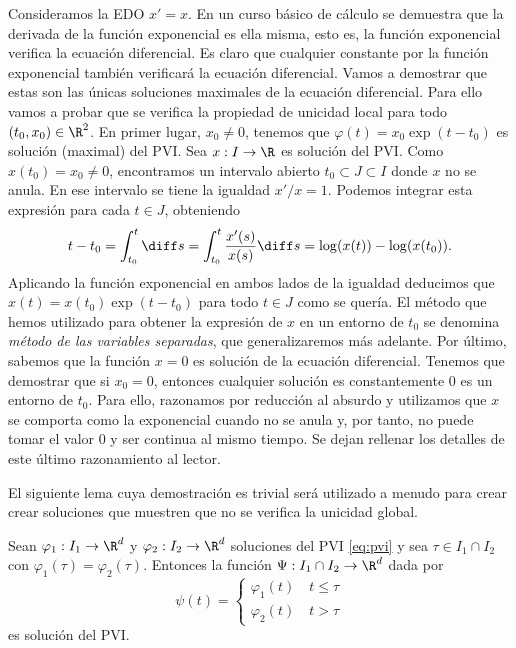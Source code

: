 \documentclass{article}
\begin{document}
\begin{ex} \label{ex:exp}
  Consideramos la EDO $x' = x$. En un curso básico de cálculo se demuestra
  que la derivada de la función exponencial es ella misma, esto es, la función exponencial verifica
  la ecuación diferencial. Es claro que cualquier constante por la función exponencial también
  verificará la ecuación diferencial. Vamos a demostrar que estas son las únicas soluciones
  maximales de la ecuación diferencial. Para ello vamos a probar que se verifica la propiedad de
  unicidad local para todo $(t_0, x_0) \in \R^2$. En primer lugar, $x_0 \ne 0$, tenemos que
  $\varphi(t)=x_0\exp(t-t_0)$ es solución (maximal) del PVI. Sea $x: I \to \R$ es solución del
  PVI. Como $x(t_0) = x_0 \ne 0$, encontramos un intervalo abierto $t_0 \subset J \subset I$ donde
  $x$ no se anula. En ese intervalo se tiene la igualdad $x'/x = 1$. Podemos integrar esta expresión
  para cada $t \in J$, obteniendo
  \[t - t_0 = \int_{t_0}^{t} \diff s = \int_{t_0}^{t} \frac{x'(s)}{x(s)}\diff s = \log(x(t)) -
    \log(x(t_0)).\] Aplicando la función exponencial en ambos lados de la igualdad deducimos que
  $x(t) = x(t_0) \exp(t-t_0)$ para todo $t \in J$ como se quería. El método que hemos utilizado para
  obtener la expresión de $x$ en un entorno de $t_0$ se denomina \emph{método de las variables
    separadas}, que generalizaremos más adelante. Por último, sabemos que la función $x = 0$ es
  solución de la ecuación diferencial. Tenemos que demostrar que si $x_0 = 0$, entonces cualquier
  solución es constantemente $0$ es un entorno de $t_0$. Para ello, razonamos por reducción al
  absurdo y utilizamos que $x$ se comporta como la exponencial cuando no se anula y, por tanto, no
  puede tomar el valor $0$ y ser continua al mismo tiempo. Se dejan rellenar los detalles de este
  último razonamiento al lector.
\end{ex}

El siguiente lema cuya demostración es trivial será utilizado a menudo para crear crear soluciones
que muestren que no se verifica la unicidad global.

\begin{lemma} \label{lem:concatenar-sols}
  Sean $\varphi_1: I_1 \to \R^d$ y $\varphi_2: I_2 \to \R^d$ soluciones del PVI \eqref{eq:pvi} y sea
  $\tau \in I_1 \cap I_2$ con $\varphi_1(\tau) = \varphi_2(\tau)$.  Entonces la función
  $\Psi: I_1 \cap I_2 \to \R^d$ dada por
  \[
    \psi(t) = \left\{
      \begin{array}{l}
        \varphi_1(t) \quad t \leq \tau \\
        \varphi_2(t) \quad t > \tau
      \end{array}
    \right.
  \]
  es solución del PVI.
\end{lemma}
\end{document}

